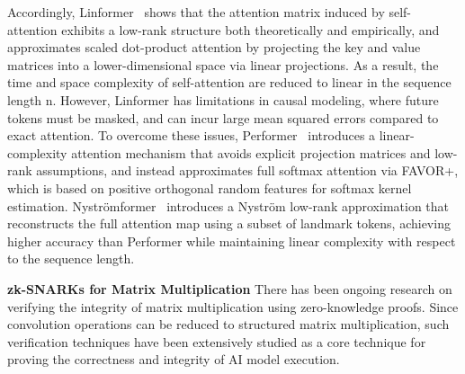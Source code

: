 \documentclass[letterpaper,twocolumn,10pt]{article}
\begin{document}
Accordingly, Linformer~\cite{Linformer} shows that the attention matrix induced by self-attention exhibits a low-rank structure both theoretically and empirically, and approximates scaled dot-product attention by projecting the key and value matrices into a lower-dimensional space via linear projections. As a result, the time and space complexity of self-attention are reduced to linear in the sequence length n.
However, Linformer has limitations in causal modeling, where future tokens must be masked, and can incur large mean squared errors compared to exact attention. To overcome these issues, Performer~\cite{Performer} introduces a linear-complexity attention mechanism that avoids explicit projection matrices and low-rank assumptions, and instead approximates full softmax attention via FAVOR+, which is based on positive orthogonal random features for softmax kernel estimation.
Nyströmformer~\cite{Nystromformer} introduces a Nyström low-rank approximation that reconstructs the full attention map using a subset of landmark tokens, achieving higher accuracy than Performer while maintaining linear complexity with respect to the sequence length.

\textbf{zk-SNARKs for Matrix Multiplication}
There has been ongoing research on verifying the integrity of matrix multiplication using zero-knowledge proofs. Since convolution operations can be reduced to structured matrix multiplication, such verification techniques have been extensively studied as a core technique for proving the correctness and integrity of AI model execution.
\end{document}
